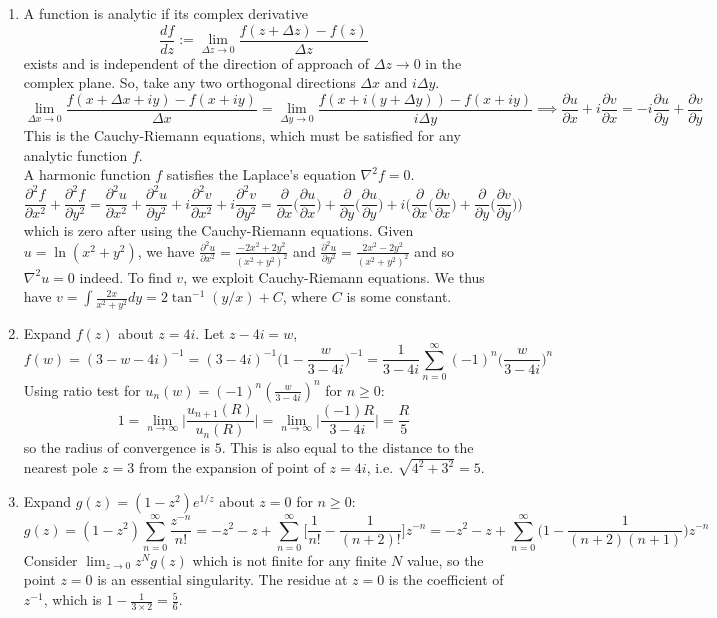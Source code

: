 \documentclass[a4paper]{article}
\begin{document}
\begin{ans}\leavevmode
\begin{enumerate}[label=(\alph*)]
\item A function is analytic if its complex derivative
$$\frac{df}{dz}:=\lim_{\Delta z\rightarrow0}\frac{f(z+\Delta z)-f(z)}{\Delta z}$$
exists and is independent of the direction of approach of $\Delta z\rightarrow0$ in the complex plane. So, take any two orthogonal directions $\Delta x$ and $i\Delta y$.
$$\lim_{\Delta x\rightarrow0}\frac{f(x+\Delta x+iy)-f(x+iy)}{\Delta x}=\lim_{\Delta y\rightarrow0}\frac{f(x+i(y+\Delta y))-f(x+iy)}{i\Delta y}\implies\frac{\partial u}{\partial x}+i\frac{\partial v}{\partial x}=-i\frac{\partial u}{\partial y}+\frac{\partial v}{\partial y}$$
This is the Cauchy-Riemann equations, which must be satisfied for any analytic function $f$.\\[5pt]
A harmonic function $f$ satisfies the Laplace's equation $\nabla^2f=0$.
$$\frac{\partial^2f}{\partial x^2}+\frac{\partial^2f}{\partial y^2}=\frac{\partial^2u}{\partial x^2}+\frac{\partial^2u}{\partial y^2}+i\frac{\partial^2v}{\partial x^2}+i\frac{\partial^2v}{\partial y^2}=\frac{\partial}{\partial x}\bigg(\frac{\partial u}{\partial x}\bigg)+\frac{\partial}{\partial y}\bigg(\frac{\partial u}{\partial y}\bigg)+i\bigg(\frac{\partial}{\partial x}\bigg(\frac{\partial v}{\partial x}\bigg)+\frac{\partial}{\partial y}\bigg(\frac{\partial v}{\partial y}\bigg)\bigg)$$
which is zero after using the Cauchy-Riemann equations. Given $u=\ln(x^2+y^2)$, we have $\frac{\partial^2u}{\partial x^2}=\frac{-2x^2+2y^2}{(x^2+y^2)^2}$ and $\frac{\partial^2u}{\partial y^2}=\frac{2x^2-2y^2}{(x^2+y^2)^2}$ and so $\nabla^2u=0$ indeed. To find $v$, we exploit Cauchy-Riemann equations. We thus have $v=\int\frac{2x}{x^2+y^2}dy=2\tan^{-1}(y/x)+C$, where $C$ is some constant.
\item Expand $f(z)$ about $z=4i$. Let $z-4i=w$,
$$f(w)=(3-w-4i)^{-1}=(3-4i)^{-1}\bigg(1-\frac{w}{3-4i}\bigg)^{-1}=\frac{1}{3-4i}\sum_{n=0}^\infty (-1)^n\bigg(\frac{w}{3-4i}\bigg)^n$$
Using ratio test for $u_n(w)=(-1)^n(\frac{w}{3-4i})^n$ for $n\geq 0$:
$$1=\lim_{n\rightarrow\infty}\bigg|\frac{u_{n+1}(R)}{u_n(R)}\bigg|=\lim_{n\rightarrow\infty}\bigg|\frac{(-1)R}{3-4i}\bigg|=\frac{R}{5}$$
so the radius of convergence is $5$. This is also equal to the distance to the nearest pole $z=3$ from the expansion of point of $z=4i$, i.e. $\sqrt{4^2+3^2}=5$.
\item Expand $g(z)=(1-z^2)e^{1/z}$ about $z=0$ for $n\geq 0$:
$$g(z)=(1-z^2)\sum_{n=0}^\infty\frac{z^{-n}}{n!}=-z^2-z+\sum_{n=0}^\infty\bigg[\frac{1}{n!}-\frac{1}{(n+2)!}\bigg]z^{-n}=-z^2-z+\sum_{n=0}^\infty\bigg(1-\frac{1}{(n+2)(n+1)}\bigg)z^{-n}$$
Consider $\lim_{z\rightarrow 0}z^Ng(z)$ which is not finite for any finite $N$ value, so the point $z=0$ is an essential singularity. The residue at $z=0$ is the coefficient of $z^{-1}$, which is $1-\frac{1}{3\times 2}=\frac{5}{6}$. 
\end{enumerate}
\end{ans}
\end{document}
